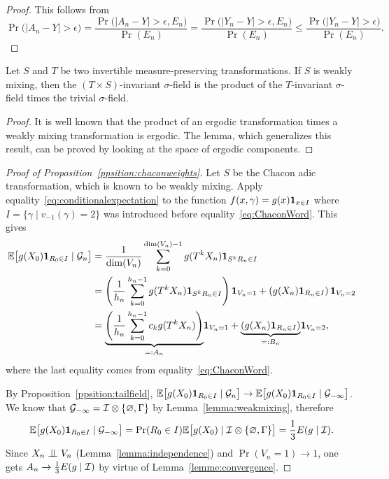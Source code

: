 \documentclass[12pt,a4paper]{article}
\begin{document}
\begin{proof}
This follows from
$$
\Pr\bigl(|A_n - Y|> \epsilon\bigr) = 
\frac{\Pr\bigl(|A_n - Y|> \epsilon, E_n\bigr)}{\Pr(E_n)} 
= \frac{\Pr\bigl(|Y_n - Y|> \epsilon, E_n\bigr)}{\Pr(E_n)} 
\leq \frac{\Pr\bigl(|Y_n - Y|> \epsilon)}{\Pr(E_n)}.  
$$
\end{proof}

\begin{lemma}\label{lemma:weakmixing}
Let $S$ and $T$ be two invertible measure-preserving transformations. 
If $S$ is weakly mixing, then the $(T\times S)$-invariant $\sigma$-field is 
the product of the $T$-invariant $\sigma$-field times the trivial $\sigma$-field.
\end{lemma}

\begin{proof}
It is well known that the product of an ergodic transformation times a weakly mixing 
transformation is ergodic. 
The lemma, which generalizes this result,  can be proved by 
looking at the space of ergodic components. 
\end{proof}

\begin{proof}[Proof of Proposition~\ref{ppsition:chaconweights}]
Let $S$ be the Chacon adic transformation, which is known to be weakly mixing. 
Apply equality~\eqref{eq:conditionalexpectation} to the function
$f(x,\gamma) = g(x)\boldsymbol 1_{x \in I}$ where $I = \{\gamma \mid v_{-1}(\gamma)=2\}$ 
was introduced before equality~\eqref{eq:ChaconWord}. 
This gives
\begin{align*}
\mathbb{E}\bigl[g(X_0) \boldsymbol 1_{R_0 \in I} \mid \mathcal{G}_n\bigr]
&  = \frac{1}{\dim(V_n)}\sum_{k=0}^{\dim(V_n)-1} g(T^kX_n) \boldsymbol 1_{S^k R_n \in I} \\
& = \left(\frac{1}{h_n}\sum_{k=0}^{h_n-1} g(T^kX_n) \boldsymbol 1_{S^k R_n \in I}\right)\boldsymbol 1_{V_n=1} 
+ \left(g(X_n) \boldsymbol 1_{R_n \in I}\right)\boldsymbol 1_{V_n=2} \\
& = \underset{=:A_n}{\underbrace{\left(\frac{1}{h_n}\sum_{k=0}^{h_n-1} c_k g(T^kX_n) \right)}}\boldsymbol 1_{V_n=1} 
+ \underset{=:B_n}{\underbrace{\left(g(X_n) \boldsymbol 1_{R_n \in I}\right)}}\boldsymbol 1_{V_n=2},
\end{align*}
where the last equality comes from equality~\eqref{eq:ChaconWord}. 

By Proposition~\ref{ppsition:tailfield}, 
$\mathbb{E}\bigl[g(X_0) \boldsymbol 1_{R_0 \in I} \mid \mathcal{G}_n\bigr] 
\to \mathbb{E}\bigl[g(X_0) \boldsymbol 1_{R_0 \in I} \mid \mathcal{G}_{-\infty}\bigr]$. 
We know that $\mathcal{G}_{-\infty} = {\cal I} \otimes \{\varnothing, \Gamma\}$ 
by Lemma~\ref{lemma:weakmixing}, therefore 
$$
\mathbb{E}\bigl[g(X_0) \boldsymbol 1_{R_0 \in I} \mid \mathcal{G}_{-\infty}\bigr] = 
\Pr(R_0 \in I) \mathbb{E}\bigl[g(X_0) \mid {\cal I} \otimes \{\varnothing, \Gamma\}\bigr] =
\frac{1}{3} E(g \mid {\cal I}). 
$$
Since $X_n \indep V_n$ (Lemma~\ref{lemma:independence})  and $\Pr(V_n=1) \to 1$, 
one gets $A_n \to \frac{1}{3} E(g \mid {\cal I})$ by virtue of 
Lemma~\ref{lemme:convergence}. 
\end{proof}
\end{document}
